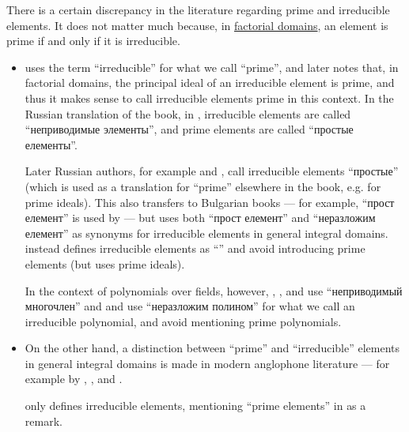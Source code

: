 \begin{remark}\label{rem:prime_and_irreducible_terminology}
  There is a certain discrepancy in the literature regarding prime and irreducible elements. It does not matter much because, in \hyperref[def:factorial_domain]{factorial domains}, an element is prime if and only if it is irreducible.

  \begin{itemize}
    \item \Textcite[111]{Lang2002Algebra} uses the term \enquote{irreducible} for what we call \enquote{prime}, and later notes that, in factorial domains, the principal ideal of an irreducible element is prime, and thus it makes sense to call irreducible elements prime in this context. In the Russian translation of the book, in \cite[89]{Ленг1968Алгебра}, irreducible elements are called \enquote{неприводимые элементы}, and prime elements are called \enquote{простые елементы}.

    Later Russian authors, for example \textcite[def. 3.5]{Винберг2014КурсАлгебры} and \textcite[30]{Шафаревич2019ОсновныеПонятияАлгебры}, call irreducible elements \enquote{простые} (which is used as a translation for \enquote{prime} elsewhere in the book, e.g. for prime ideals). This also transfers to Bulgarian books --- for example, \enquote{прост елемент} is used by \textcite[def. VI.5]{ГеновМиховскиМоллов1991Алгебра} --- but \textcite[413]{Обрешков1962ВисшаАлгебра} uses both \enquote{прост елемент} and \enquote{неразложим елемент} as synonyms for irreducible elements in general integral domains. \Textcite[125]{Тыртышников2017ОсновыАлгебры} instead defines irreducible elements as \enquote{} and avoid introducing prime elements (but uses prime ideals).

    In the context of polynomials over fields, however,
    \textcite[161]{Курош1968КурсВысшейАлгебры},
    \textcite[121]{Винберг2014КурсАлгебры},
    \textcite[190]{Кострикин2020АлгебраЧасть1} and
    \textcite[19]{Шафаревич2019ОсновныеПонятияАлгебры}
    use \enquote{неприводимый многочлен} and \textcite[409]{Обрешков1962ВисшаАлгебра} and \textcite[def. VI.3]{ГеновМиховскиМоллов1991Алгебра} use \enquote{неразложим полином} for what we call an irreducible polynomial, and avoid mentioning prime polynomials.

    \item On the other hand, a distinction between \enquote{prime} and \enquote{irreducible} elements in general integral domains is made in modern anglophone literature --- for example by
    \textcite[343]{Jacobson1985BasicAlgebraI},
    \textcite[388; 389]{Knapp2016BasicAlgebra},
    \textcite[27; 29]{Eisenbud1995CommutativeAlgebra} and
    \textcite[def. V.1.6]{Aluffi2009Algebra}.

    \textcite[67]{Rotman2015AdvancedModernAlgebraPart1} only defines irreducible elements, mentioning \enquote{prime elements} in \cite[105]{Rotman2015AdvancedModernAlgebraPart1} as a remark.
  \end{itemize}
\end{remark}

